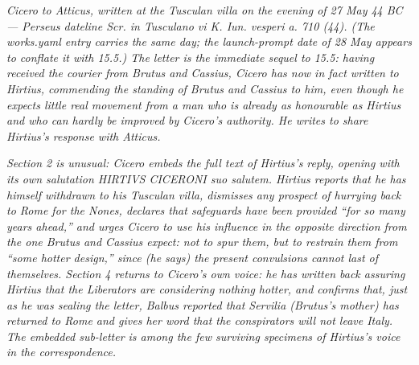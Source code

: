 
\textit{Cicero to Atticus, written at the Tusculan villa on the
evening of 27 May 44 BC --- Perseus dateline \textit{Scr. in
Tusculano vi K. Iun. vesperi a. 710 (44)}. (The works.yaml
entry carries the same day; the launch-prompt date of 28 May
appears to conflate it with 15.5.) The letter is the immediate
sequel to 15.5: having received the courier from Brutus and
Cassius, Cicero has now in fact written to Hirtius, commending
the standing of Brutus and Cassius to him, even though he
expects little real movement from a man who is already as
honourable as Hirtius and who can hardly be improved by
Cicero's authority. He writes to share Hirtius's response with
Atticus.}

\textit{Section 2 is unusual: Cicero embeds the full text of
Hirtius's reply, opening with its own salutation
\textit{HIRTIVS CICERONI suo salutem}. Hirtius reports that he
has himself withdrawn to his Tusculan villa, dismisses any
prospect of hurrying back to Rome for the Nones, declares that
safeguards have been provided ``for so many years ahead,'' and
urges Cicero to use his influence in the opposite direction
from the one Brutus and Cassius expect: not to spur them, but
to restrain them from ``some hotter design,'' since (he says)
the present convulsions cannot last of themselves. Section 4
returns to Cicero's own voice: he has written back assuring
Hirtius that the Liberators are considering nothing hotter,
and confirms that, just as he was sealing the letter, Balbus
reported that Servilia (Brutus's mother) has returned to Rome
and gives her word that the conspirators will not leave Italy.
The embedded sub-letter is among the few surviving specimens
of Hirtius's voice in the correspondence.}
